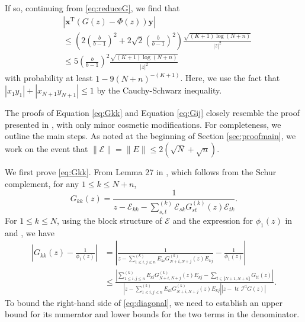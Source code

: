 \documentclass[reqno]{amsart}
\DeclareMathOperator{\tr}{tr}
\newcommand{\T}{\mathrm{T}}
\theoremstyle{plain}
\theoremstyle{definition}
\begin{document}
If so, continuing from \eqref{eq:reduceG}, we find that 
\begin{align*}
&\left| \mathbf x^\T \left(G(z)-\Phi(z) \right) \mathbf y \right|\\
 &\le \left(2\left(\frac{b}{b-1} \right)^2 + 2\sqrt{2}\left(\frac{b}{b-1} \right)^2 \right) \frac{  \sqrt{(K+1)\log (N+n)}}{ |z|^2}\\
&\le 5\left(\frac{b}{b-1} \right)^2 \frac{  \sqrt{(K+1)\log (N+n)}}{ |z|^2}
\end{align*}
with probability at least $1-9(N+n)^{-(K+1)}$. Here, we use the fact that $|x_1 y_1|+|x_{N+1} y_{N+1}|\le 1$ by the Cauchy-Schwarz inequality. 

The proofs of Equation \eqref{eq:Gkk} and Equation \eqref{eq:Gij} closely resemble the proof presented in \cite[Lemma 28]{OVW22}, with only minor cosmetic modifications. For completeness, we outline the main steps. As noted at the beginning of Section \ref{sec:proofmain}, we work on the event that $\|\mathcal E\|=\|E \| \leq 2 (\sqrt N +\sqrt{n})$.

We first prove \eqref{eq:Gkk}. From Lemma 27 in \cite{OVW22}, which follows from the Schur complement, for any $1\le k \le N+n$, \[ G_{kk}(z)  = \frac{1}{z - \mathcal E_{kk} - \sum_{ s,t}^{(k)} \mathcal E_{sk} G_{st}^{(k)}(z) \mathcal E_{tk} }. \]
For $1\le k \le N$, using the block structure of $\mathcal E$ and the expression for $\phi_1(z)$ in \cite[Eq. (26)]{Wang24} and \cite[Eq. (27)]{Wang24}, we have
\begin{align} \label{eq:diagonal}
	\left| G_{kk}(z) - \frac{1}{\phi_1(z)}  \right| &= \left| \frac{1}{z - \sum_{1\le i,j\le n}^{(k)} E_{ki} G_{N+i,N+j}^{(k)}(z) E_{kj}}- \frac{1}{\phi_1(z)} \right| \nonumber\\
	&\le \frac{ |\sum_{1\le i,j\le n}^{(k)} E_{ki} G_{N+i,N+j}^{(k)}(z) E_{kj}  - \sum_{t \in \llbracket N+1,N+n \rrbracket} G_{tt}(z)|}{ |z - \sum_{1\le i,j\le n}^{(k)} E_{ki} G_{N+i,N+j}^{(k)}(z) E_{kj}| |z - \tr \mathcal I^\mathrm{d} G(z)| }. 
\end{align} 
To bound the right-hand side of \eqref{eq:diagonal}, we need to establish an upper bound for its numerator and lower bounds for the two terms in the denominator. 
\end{document}
